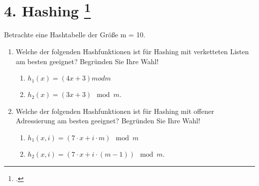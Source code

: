 \documentclass{lehramt-informatik-minimal}
\begin{document}
\section{4. Hashing
\footcite[Thema 2 Aufgabe 4 Seite 7]{examen:66115:2016:03}}

Betrachte eine Hashtabelle der Größe m = 10.

\begin{enumerate}


\item Welche der folgenden Hashfunktionen ist für Hashing mit
verketteten Listen am besten geeignet? Begründen Sie Ihre Wahl!

\begin{enumerate}
\item $h_1(x) = (4x + 3) mod m$
\item $h_2(x) = (3x + 3) \mod m$.
\end{enumerate}


\item Welche der folgenden Hashfunktionen ist für Hashing mit offener
Adressierung am besten geeignet? Begründen Sie Ihre Wahl!

\begin{enumerate}
\item $h_1(x,i) = (7 \cdot x + i \cdot m) \mod m$
\item $h_2(x,i) = (7 \cdot x + i \cdot (m - 1)) \mod m$.
\end{enumerate}
\end{enumerate}
\end{document}
